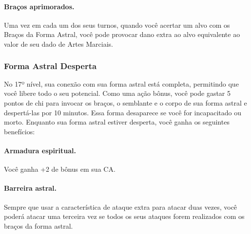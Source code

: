 \begin{multicols}{2}
\paragraph{Braços aprimorados.}%
Uma vez em cada um dos seus turnos, quando você acertar um alvo com os Braços da
Forma Astral, você pode provocar dano extra ao alvo equivalente ao valor de seu
dado de Artes Marciais.

\subsubsection*{Forma Astral Desperta}%
\label{ssub:forma_astral_desperta}

No 17º nível, sua conexão com sua forma astral está completa, permitindo que
você libere todo o seu potencial. Como uma ação bônus, você pode gastar 5 pontos
de chi para invocar os braços, o semblante e o corpo de sua forma astral e
despertá-las por 10 minutos. Essa forma desaparece se você for incapacitado ou
morto.
Enquanto sua forma astral estiver desperta, você ganha os seguintes benefícios:

\paragraph{Armadura espiritual.}%
Você ganha +2 de bônus em sua CA.

\paragraph{Barreira astral.}%
Sempre que usar a característica de ataque extra para atacar duas vezes, você
poderá atacar uma terceira vez se todos os seus ataques forem realizados com os
braços da forma astral.

\end{multicols}
